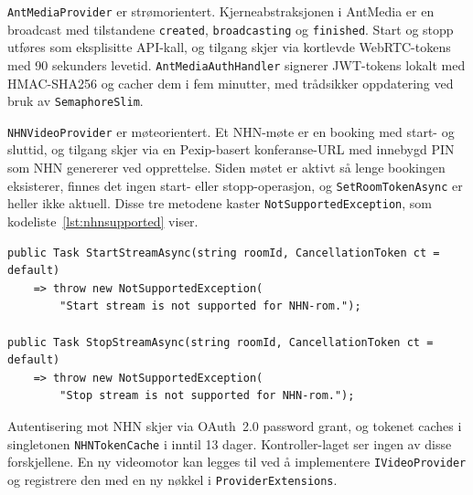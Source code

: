 \texttt{AntMediaProvider} er strømorientert. Kjerneabstraksjonen i AntMedia er en broadcast med tilstandene \texttt{created}, \texttt{broadcasting} og \texttt{finished}. Start og stopp utføres som eksplisitte API-kall, og tilgang skjer via kortlevde WebRTC-tokens med 90 sekunders levetid. \texttt{AntMediaAuthHandler} signerer JWT-tokens lokalt med HMAC-SHA256 og cacher dem i fem minutter, med trådsikker oppdatering ved bruk av \texttt{SemaphoreSlim}.

\texttt{NHNVideoProvider} er møteorientert. Et NHN-møte er en booking
med start- og sluttid, og tilgang skjer via en Pexip-basert
konferanse-URL med innebygd PIN som NHN genererer ved opprettelse. Siden
møtet er aktivt så lenge bookingen eksisterer, finnes det ingen
start- eller stopp-operasjon, og \texttt{SetRoomTokenAsync} er heller
ikke aktuell. Disse tre metodene kaster \texttt{NotSupportedException},
som kodeliste~\ref{lst:nhnsupported} viser.

\begin{lstlisting}[language={[Sharp]C}, label=lst:nhnsupported,
  caption={NHN-operasjoner som ikke er støttet.}]
public Task StartStreamAsync(string roomId, CancellationToken ct = default)
    => throw new NotSupportedException(
        "Start stream is not supported for NHN-rom.");

public Task StopStreamAsync(string roomId, CancellationToken ct = default)
    => throw new NotSupportedException(
        "Stop stream is not supported for NHN-rom.");
\end{lstlisting}

Autentisering mot NHN skjer via OAuth~2.0 password grant, og tokenet
caches i singletonen \texttt{NHNTokenCache} i inntil 13 dager.
Kontroller-laget ser ingen av disse forskjellene. En ny videomotor kan
legges til ved å implementere \texttt{IVideoProvider} og registrere den
med en ny nøkkel i \texttt{ProviderExtensions}.